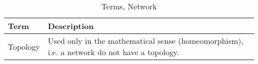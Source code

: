 \begin{table}[H]
    \caption{Terms, Network}
    \label{tab:terms:network}
    \centering
    \begin{tabular}{p{} p{}}
        \toprule
        \textbf{Term} & \textbf{Description}\\
        \toprule

        Topology &
        Used only in the mathematical sense (homeomorphism), i.e. a network do not have a topology.
        \\

        \toprule
    \end{tabular}
\end{table}
